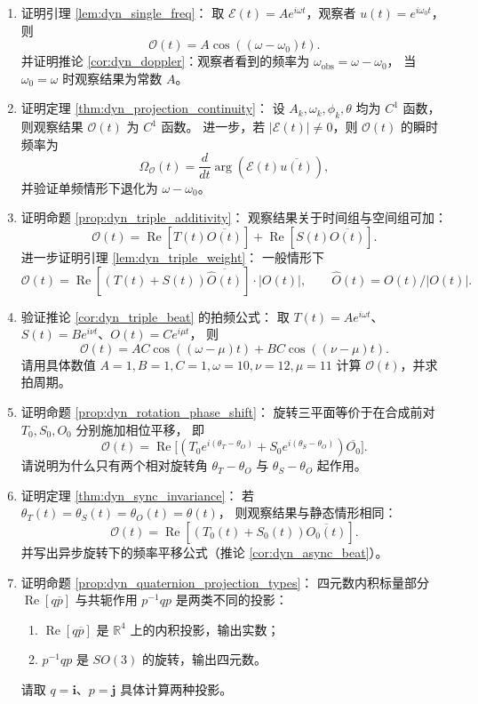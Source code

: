 \begin{enumerate}[leftmargin=3em, label=\textbf{题 \arabic*}]
    \item 证明引理 \ref{lem:dyn_single_freq}：
    取 $\mathcal{E}(t)=Ae^{i\omega t}$，观察者 $u(t)=e^{i\omega_0 t}$，则
    \[
    \mathcal{O}(t)=A\cos((\omega-\omega_0)t).
    \]
    并证明推论 \ref{cor:dyn_doppler}：观察者看到的频率为
    $\omega_{\text{obs}}=\omega-\omega_0$，
    当 $\omega_0=\omega$ 时观察结果为常数 $A$。

    \item 证明定理 \ref{thm:dyn_projection_continuity}：
    设 $A_k,\omega_k,\phi_k,\theta$ 均为 $C^1$ 函数，
    则观察结果 $\mathcal{O}(t)$ 为 $C^1$ 函数。
    进一步，若 $|\mathcal{E}(t)|\neq0$，则 $\mathcal{O}(t)$ 的瞬时频率为
    \[
    \Omega_{\mathcal{O}}(t)=\frac{d}{dt}\arg(\mathcal{E}(t)\overline{u(t)}),
    \]
    并验证单频情形下退化为 $\omega-\omega_0$。

    \item 证明命题 \ref{prop:dyn_triple_additivity}：
    观察结果关于时间组与空间组可加：
    \[
    \mathcal{O}(t)=\operatorname{Re}[T(t)\overline{O(t)}]
    +\operatorname{Re}[S(t)\overline{O(t)}].
    \]
    进一步证明引理 \ref{lem:dyn_triple_weight}：
    一般情形下
    \[
    \mathcal{O}(t)=\operatorname{Re}[(T(t)+S(t))\overline{\widehat{O}(t)}]\cdot|O(t)|,
    \qquad
    \widehat{O}(t)=O(t)/|O(t)|.
    \]

    \item 验证推论 \ref{cor:dyn_triple_beat} 的拍频公式：
    取 $T(t)=Ae^{i\omega t}$、$S(t)=Be^{i\nu t}$、$O(t)=Ce^{i\mu t}$，
    则
    \[
    \mathcal{O}(t)=AC\cos((\omega-\mu)t)+BC\cos((\nu-\mu)t).
    \]
    请用具体数值 $A=1,B=1,C=1,\omega=10,\nu=12,\mu=11$
    计算 $\mathcal{O}(t)$，并求拍周期。

    \item 证明命题 \ref{prop:dyn_rotation_phase_shift}：
    旋转三平面等价于在合成前对 $T_0,S_0,O_0$ 分别施加相位平移，
    即
    \[
    \mathcal{O}(t)=\operatorname{Re}\big[(T_0e^{i(\theta_T-\theta_O)}
    +S_0e^{i(\theta_S-\theta_O)})\overline{O_0}\big].
    \]
    请说明为什么只有两个相对旋转角 $\theta_T-\theta_O$ 与 $\theta_S-\theta_O$ 起作用。

    \item 证明定理 \ref{thm:dyn_sync_invariance}：
    若 $\theta_T(t)=\theta_S(t)=\theta_O(t)=\theta(t)$，
    则观察结果与静态情形相同：
    \[
    \mathcal{O}(t)=\operatorname{Re}[(T_0(t)+S_0(t))\overline{O_0(t)}].
    \]
    并写出异步旋转下的频率平移公式（推论 \ref{cor:dyn_async_beat}）。

    \item 证明命题 \ref{prop:dyn_quaternion_projection_types}：
    四元数内积标量部分 $\operatorname{Re}[q\overline{p}]$
    与共轭作用 $p^{-1}qp$ 是两类不同的投影：
    \begin{enumerate}[label=(\roman*)]
        \item $\operatorname{Re}[q\overline{p}]$ 是 $\mathbb{R}^4$ 上的内积投影，输出实数；
        \item $p^{-1}qp$ 是 $SO(3)$ 的旋转，输出四元数。
    \end{enumerate}
    请取 $q=\mathbf{i}$、$p=\mathbf{j}$ 具体计算两种投影。


\end{enumerate}

